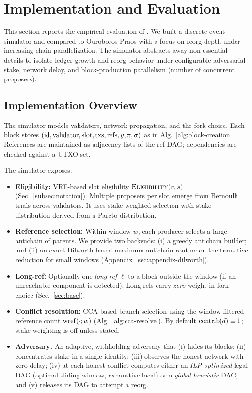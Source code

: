 \section{Implementation and Evaluation}
\label{sec:impl-eval}
This section reports the empirical evaluation of \ProjBase. We built a discrete-event simulator and compared \ProjBase to Ouroboros Praos with a focus on reorg depth under increasing chain parallelization. The simulator abstracts away non-essential details to isolate ledger growth and reorg behavior under configurable adversarial stake, network delay, and block-production parallelism (number of concurrent proposers).

\subsection{Implementation Overview}
The simulator models validators, network propagation, and the \ProjBase{} fork-choice. Each block stores
$(\mathrm{id},\mathrm{validator},\mathrm{slot},\mathrm{txs},\mathrm{refs},y,\pi,\sigma)$ as in Alg.~\ref{alg:block-creation}. References are maintained as adjacency lists of the ref-DAG; dependencies are checked against a UTXO set.

The simulator exposes:
\begin{itemize}
\item \textbf{Eligibility:} VRF-based slot eligibility $\textsc{Eligibility}(v,s)$ (Sec.~\ref{subsec:notation}). Multiple proposers per slot emerge from Bernoulli trials across validators. It uses stake-weighted selection with stake distribution derived from a Pareto distribution.
\item \textbf{Reference selection:} Within window $w$, each producer selects a large antichain of parents. We provide two backends: (i) a greedy antichain builder; and (ii) an exact Dilworth-based maximum-antichain routine on the transitive reduction for small windows (Appendix~\ref{sec:appendix-dilworth}).
\item \textbf{Long-ref:} Optionally one \emph{long-ref} $\ell$ to a block outside the window (if an unreachable component is detected). Long-refs carry \emph{zero} weight in fork-choice (Sec.~\ref{sec:base}).
\item \textbf{Conflict resolution:} CCA-based branch selection using the window-filtered reference count $\mathrm{wref}(\cdot;w)$ (Alg.~\ref{alg:cca-resolve}). By default $\mathrm{contrib}(d)\equiv 1$; stake-weighting is off unless stated.
\item \textbf{Adversary:} An adaptive, withholding adversary that (i) hides its blocks; (ii) concentrates stake in a single identity; (iii) observes the honest network with zero delay; (iv) at each honest conflict computes either an \emph{ILP-optimized} legal DAG (optimal sliding window, exhaustive local) or a \emph{global heuristic} DAG; and (v) releases its DAG to attempt a reorg.
\end{itemize}


